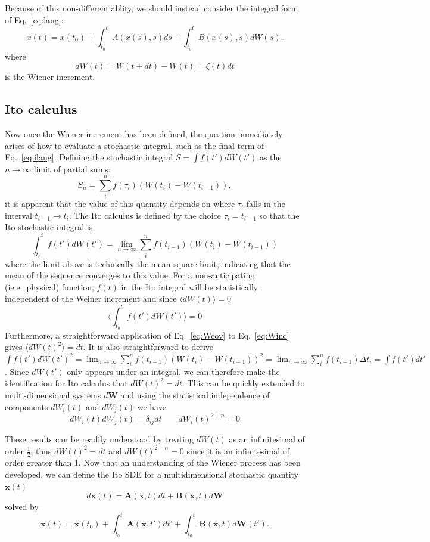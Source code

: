 \documentclass[onecolumn,notitlepage,pra,10pt,aps]{revtex4-1}
\newcommand {\be}{\begin{equation}}
\newcommand {\ee}{\end{equation}}
\newcommand{\expect}[1]{\langle#1\rangle}
\begin{document}
Because of this non-differentiablity, we should instead consider the integral form of  Eq.~\eqref{eq:lang}:
\be
x(t)=x(t_0)+\int_{t_0}^t A(x(s), s)ds+\int_{t_0}^t B(x(s), s) dW(s). \label{eq:ilang}
\ee
where
\be
dW(t)=W(t+dt)-W(t)=\zeta(t)dt \label{eq:Winc}
\ee
is the Wiener increment.

\subsection{Ito calculus}
Now once the Wiener increment has been defined, the question immediately arises of how to evaluate a stochastic integral, such as the final term of Eq.~\eqref{eq:ilang}.  Defining the stochastic integral $S=\int f(t')dW(t')$ as the $n\to\infty$ limit of partial sums:
\be
S_n=\sum_i^n f(\tau_i)\left(W(t_i)-W(t_{i-1})\right),
\ee
it is apparent that the value of this quantity depends on where $\tau_i$ falls in the interval $t_{i-1}\to t_i$.  The Ito calculus is defined by the choice $\tau_i=t_{i-1}$ so that the Ito stochastic integral is 
\be
\int_{t_0}^t f(t')dW(t')=\lim_{n\to\infty} \sum_i^n f(t_{i-1})\left(W(t_i)-W(t_{i-1})\right) \label{eq:ItoInt}
\ee
where the limit above is technically the mean square limit, indicating that the mean of the sequence converges to this value.  For a non-anticipating (ie.e.~physical) function, $f(t)$ in the Ito integral will be statistically independent of the Weiner increment and since  $\expect{dW(t)}=0$ 
\be
\expect{\int_{t_0}^t f(t')dW(t')}=0 \label{eq:meandw}
\ee
Furthermore, a straightforward application of Eq.~\eqref{eq:Wcov} to Eq.~\eqref{eq:Winc} gives $\expect{dW(t)^2}=dt$. It is also straightforward to derive $\int f(t') dW(t')^2=\lim_{n\to\infty} \sum_i^n f(t_{i-1})\left(W(t_i)-W(t_{i-1})\right)^2=\lim_{n\to\infty} \sum_i^n f(t_{i-1})\Delta t_i=\int f(t') dt'$.     Since $dW(t')$ only appears under an integral, we can therefore make the identification for Ito calculus that
$
dW(t)^2=dt 
$.  This can be quickly extended to multi-dimensional systems $d\mathbf{W}$ and using the statistical independence of components $dW_i(t)$ and $dW_j(t)$ we have 
  \be
  dW_i(t)dW_j(t)=\delta_{ij}dt \quad \quad
  dW_i(t)^{2+n}=0  \label{eq:dw2}
  \ee

These results can be readily understood by treating $dW(t)$ as an infinitesimal of order $\frac{1}{2}$, thus  $dW(t)^2=dt$ and $dW(t)^{2+n}=0$ since it is an infinitesimal of order greater than 1.  Now that an understanding of the Wiener process has been developed, we can define the Ito SDE for a multidimensional stochastic quantity $\mathbf{x}(t)$
\be
d\mathbf{x}(t)=\mathbf{A}(\mathbf{x}, t)dt+\mathbf{B}(\mathbf{x}, t)d\mathbf{W}\label{eq:sde}
\ee
solved by 
\be
\mathbf{x}(t)=\mathbf{x}(t_0)+\int_{t_0}^t \mathbf{A}(\mathbf{x}, t')dt'+\int_{t_0}^t \mathbf{B}(\mathbf{x}, t)d\mathbf{W}(t').\label{eq:intsde}
\ee
\end{document}
